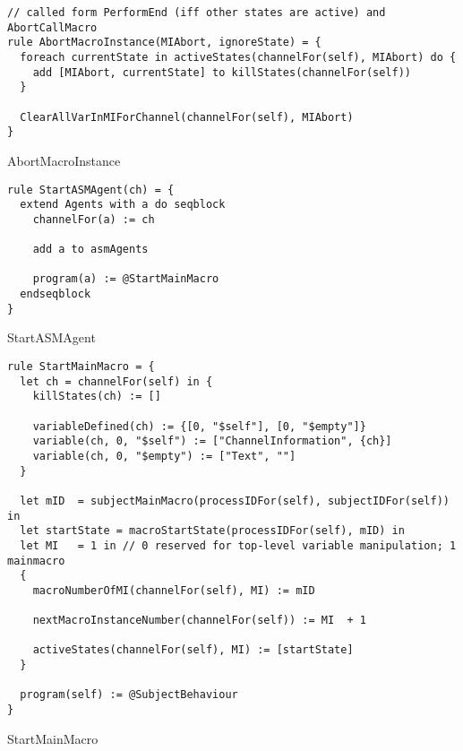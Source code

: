 \begin{listing}[H]
\begin{verbatim}
// called form PerformEnd (iff other states are active) and AbortCallMacro
rule AbortMacroInstance(MIAbort, ignoreState) = {
  foreach currentState in activeStates(channelFor(self), MIAbort) do {
    add [MIAbort, currentState] to killStates(channelFor(self))
  }

  ClearAllVarInMIForChannel(channelFor(self), MIAbort)
}
\end{verbatim}
\caption{AbortMacroInstance}
\label{lst:asm:AbortMacroInstance}
\end{listing}




\begin{listing}[H]
\begin{verbatim}
rule StartASMAgent(ch) = {
  extend Agents with a do seqblock
    channelFor(a) := ch

    add a to asmAgents

    program(a) := @StartMainMacro
  endseqblock
}
\end{verbatim}
\caption{StartASMAgent}
\label{lst:asm:StartASMAgent}
\end{listing}


\begin{listing}[H]
\begin{verbatim}
rule StartMainMacro = {
  let ch = channelFor(self) in {
    killStates(ch) := []

    variableDefined(ch) := {[0, "$self"], [0, "$empty"]}
    variable(ch, 0, "$self") := ["ChannelInformation", {ch}]
    variable(ch, 0, "$empty") := ["Text", ""]
  }

  let mID  = subjectMainMacro(processIDFor(self), subjectIDFor(self)) in
  let startState = macroStartState(processIDFor(self), mID) in
  let MI   = 1 in // 0 reserved for top-level variable manipulation; 1 mainmacro
  {
    macroNumberOfMI(channelFor(self), MI) := mID

    nextMacroInstanceNumber(channelFor(self)) := MI  + 1

    activeStates(channelFor(self), MI) := [startState]
  }

  program(self) := @SubjectBehaviour
}
\end{verbatim}
\caption{StartMainMacro}
\label{lst:asm:StartMainMacro}
\end{listing}




